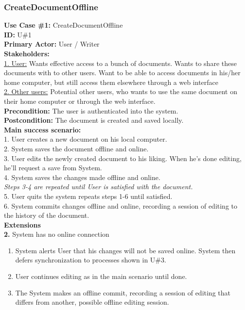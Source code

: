 \subsubsection{CreateDocumentOffline}
\textbf{Use Case \#1:} CreateDocumentOffline\\
\textbf{ID:} U\#1\\
\textbf{Primary Actor:} User / Writer\\
\textbf{Stakeholders:}\\
\underline{1. User:} Wants effective access to a bunch of documents. Wants to share these documents with to other users. Want to be able to access documents in his/her home computer, but still access them elsewhere through a web interface\\
\underline{2. Other users:} Potential other users, who wants to use the same document on their home computer or through the web interface.\\
\newline
\textbf{Precondition:} The user is authenticated into the system.\\
\textbf{Postcondition:} The document is created and saved locally.\\
\newline
\textbf{Main success scenario:} \\
1. User creates a new document on his local computer.\\
2. System saves the document offline and online. \\
3. User edits the newly created document to his liking. When he’s done editing, he’ll request a save from System.\\
4. System saves the changes made offline and online.\\
\indent\textit{Steps 3-4 are repeated until User is satisfied with the document.}\\
5. User quits the system repeats steps 1-6 until satisfied.\\
6. System commits changes offline and online, recording a session of editing to the history of the document.\\
\newline
\textbf{Extensions}\\
\textbf{2.} System has no online connection
\begin{enumerate}
\item System alerts User that his changes will not be saved online. System then defers synchronization to processes shown in U\#3.
\item User continues editing as in the main scenario until done.
\item The System makes an offline commit, recording a session of editing that differs from another, possible offline editing session.
\end{enumerate}


